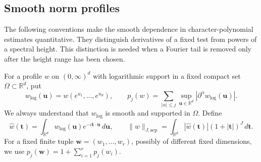 \documentclass[11pt,a4paper]{article}
\numberwithin{equation}{section}
\numberwithin{figure}{section}
\theoremstyle{definition}
\theoremstyle{remark}
\begin{document}
\subsection{Smooth norm profiles}

The following conventions make the smooth dependence in character-polynomial
estimates quantitative.  They distinguish derivatives of a fixed test from powers of a
spectral height.  This distinction is needed when a Fourier tail is removed
only after the height range has been chosen.

For a profile $w$ on $(0,\infty)^d$ with logarithmic support in a fixed
compact set $\Omega\subset\mathbb R^d$, put
\[
 w_{\log}(\boldsymbol u)=w(e^{u_1},\ldots,e^{u_d}),\qquad
 p_j(w)=\sum_{|\alpha|\le j}\sup_{\boldsymbol u\in\mathbb R^d}
                  |\partial^\alpha w_{\log}(\boldsymbol u)|.
\]
We always understand that $w_{\log}$ is smooth and supported in $\Omega$.
Define
\[
 \widehat w(\boldsymbol t)=\int_{\mathbb R^d}w_{\log}(\boldsymbol u)
                    e^{-i\boldsymbol t\cdot\boldsymbol u}\,d\boldsymbol u,
 \qquad
 \|w\|_{J,\mathrm{sep}}
 =\int_{\mathbb R^d}|\widehat w(\boldsymbol t)|
                    (1+|\boldsymbol t|)^J\,d\boldsymbol t.
\]
For a fixed finite tuple $\boldsymbol w=(w_1,\ldots,w_r)$, possibly of
different fixed dimensions, we use
$p_j(\boldsymbol w)=1+\sum_{i=1}^r p_j(w_i)$.
\end{document}
